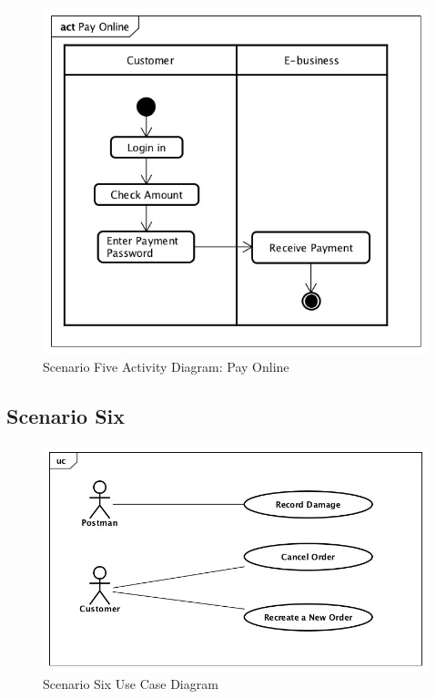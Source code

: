 \documentclass[12pt]{scrreprt}
\begin{document}
\begin{figure}[H]
  \centering\includegraphics[width=6in]{DocumentRes/5PayOnline.png}
  \caption{Scenario Five Activity Diagram: Pay Online}
\end{figure}

\subsection{Scenario Six}
\begin{figure}[H]
  \centering\includegraphics[width=5in]{DocumentRes/6UseCaseDiagram.png}
  \caption{Scenario Six Use Case Diagram}
\end{figure}
\end{document}
